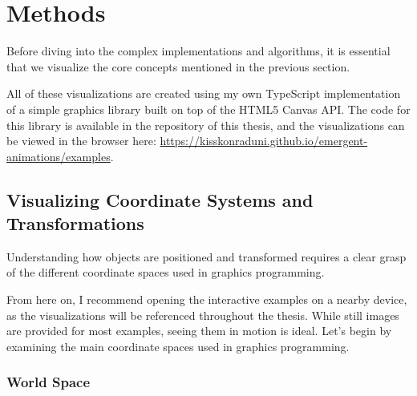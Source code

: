 \section{Methods}
\label{sec:methods}

Before diving into the complex implementations and algorithms, it is essential that we visualize the core concepts mentioned in the previous section.

\begin{Note} 
    All of these visualizations are created using my own TypeScript implementation of a simple graphics library built on top of the HTML5 Canvas API. The code for this library is available in the repository of this thesis, and the visualizations can be viewed in the browser here: \url{https://kisskonraduni.github.io/emergent-animations/examples}.
\end{Note}

\vspace{0.2cm}

\subsection{Visualizing Coordinate Systems and Transformations}
\label{sec:visualizing-coordinate-systems}

Understanding how objects are positioned and transformed requires a clear grasp of the different coordinate spaces used in graphics programming.

From here on, I recommend opening the interactive examples on a nearby device, as the visualizations will be referenced throughout the thesis. While still images are provided for most examples, seeing them in motion is ideal. Let's begin by examining the main coordinate spaces used in graphics programming.


\subsubsection{World Space}
\label{sec:world-space}

